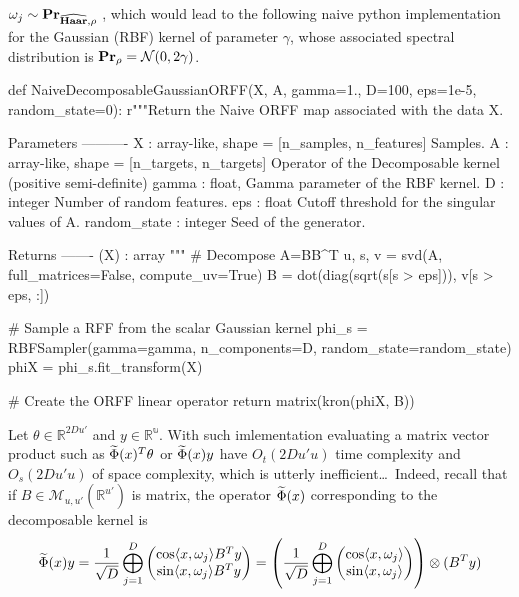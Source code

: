 $\omega_j\sim{\mathbf{{Pr}}}_{\widehat{\mathbf{Haar}}, \rho}$ \iid, which would lead to the following naive python implementation for the Gaussian (RBF) kernel of parameter $\gamma$, whose associated spectral distribution is ${\mathbf{{Pr}}}_{\rho}=\mathcal{N}(0, 2\gamma)$.
\begin{pyblock}
def NaiveDecomposableGaussianORFF(X, A, gamma=1.,
                                  D=100, eps=1e-5, random_state=0):
    r"""Return the Naive ORFF map associated with the data X.

    Parameters
    ----------
    X : {array-like}, shape = [n_samples, n_features]
        Samples.
    A : {array-like}, shape = [n_targets, n_targets]
        Operator of the Decomposable kernel (positive semi-definite)
    gamma : {float},
        Gamma parameter of the RBF kernel.
    D : {integer}
        Number of random features.
    eps : {float}
        Cutoff threshold for the singular values of A.
    random_state : {integer}
        Seed of the generator.

    Returns
    -------
    \tilde{\Phi}(X) : array
    """
    # Decompose A=BB^T
    u, s, v = svd(A, full_matrices=False, compute_uv=True)
    B = dot(diag(sqrt(s[s > eps])), v[s > eps, :])

    # Sample a RFF from the scalar Gaussian kernel
    phi_s = RBFSampler(gamma=gamma, n_components=D, random_state=random_state)
    phiX = phi_s.fit_transform(X)

    # Create the ORFF linear operator
    return matrix(kron(phiX, B))
\end{pyblock}
Let $\theta\in\mathbb{R}^{2Du'}$ and $y\in\mathbb{R^u}$. With such imlementation evaluating a matrix vector product such as $\widetilde{\Phi}(x)^T\theta$ or $\widetilde{\Phi}(x)y$ have $O_t(2Du'u)$ time complexity and $O_s(2Du'u)$ of space complexity, which is utterly inefficient\ldots~Indeed, recall that if $B\in\mathcal{M}_{u,u'}\left(\mathbb{R}^{u'}\right)$ is matrix, the operator $\widetilde{\Phi}(x)$ corresponding to the decomposable kernel is
\begin{dmath*}
\tildePhi{\omega}(x)y = \frac{1}{\sqrt{D}}\Vect_{j=1}^D\begin{pmatrix}\cos\inner{x, \omega_j} B^Ty \\ \sin\inner{x, \omega_j} B^Ty \end{pmatrix} = \left(\frac{1}{\sqrt{D}}\Vect_{j=1}^D\begin{pmatrix}\cos\inner{x, \omega_j} \\ \sin\inner{x, \omega_j} \end{pmatrix}\right)\otimes (B^Ty)
\end{dmath*}
